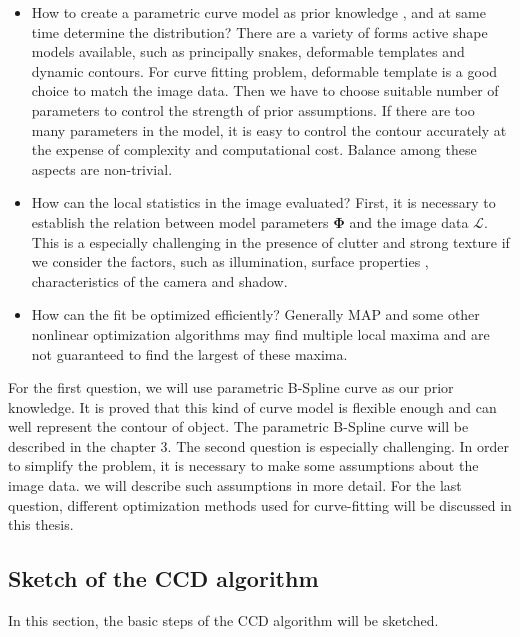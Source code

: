 \begin{itemize}
\item How to create a parametric curve model as prior knowledge , and
  at same time determine the distribution? There are a variety of
  forms active shape models available, such as principally snakes,
  deformable templates and dynamic contours. For curve fitting
  problem, deformable template is a good choice to match the image
  data. Then we have to choose suitable number of parameters to control
  the strength of prior assumptions. If there are too many parameters
  in the model, it is easy to control the contour accurately at the
  expense of complexity and computational cost. Balance among these
  aspects are non-trivial.

\item How can the local statistics in the image evaluated? First, it
  is necessary to establish the relation between model parameters
  $\mathbf{\Phi}$ and the image data $\mathcal{L}$. This is a especially
challenging in the presence of clutter and strong texture if we
consider the factors, such as  illumination, surface properties ,
characteristics of the camera and shadow. 

\item How can the fit be optimized efficiently? Generally MAP and some
  other nonlinear optimization algorithms may find multiple local maxima and are not guaranteed to find the
  largest of these maxima.
\end{itemize}


For the first question, we will use parametric B-Spline curve as
our prior knowledge. It is proved that this kind of curve model is
flexible enough and can well represent the contour of object. The
parametric B-Spline curve will be described in the chapter 3.
The second question is especially challenging. In order to simplify
the problem, it is necessary to make some assumptions about the image
data. we will describe such assumptions in more detail. For the last
question, different optimization methods used for curve-fitting will
be discussed in this thesis.

\subsection{Sketch of the CCD algorithm}
\label{sec:sccd}

In this section, the basic steps of the CCD algorithm will be sketched.

